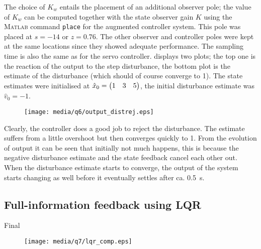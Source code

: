 The choice of $K_w$ entails the placement of an additional observer pole; the value of $K_w$ can be computed together with the state observer gain $K$ using the \textsc{Matlab} command \texttt{place} for the augmented controller system. This pole was placed at $s = -14$ or $z = 0.76$. The other observer and controller poles were kept at the same locations since they showed adequate performance. The sampling time is also the same as for the servo controller.
 displays two plots; the top one is the reaction of the output to the step disturbance, the bottom plot is the estimate of the disturbance (which should of course converge to 1). The state estimates were initialised at $\hat{x}_0 = \mqty(1 & 3 & 5)$, the initial disturbance estimate was $\hat{v}_0 = -1$.
\begin{figure}[ht!]
    \centering
    \texttt{[image: media/q6/output\_distrej.eps]}
    \caption{}
    \label{fig:q6_output_distrej}
\end{figure}
Clearly, the controller does a good job to reject the disturbance. The estimate suffers from a little overshoot but then converges quickly to 1. From the evolution of output it can be seen that initially not much happens, this is because the negative disturbance estimate and the state feedback cancel each other out. When the disturbance estimate starts to converge, the output of the system starts changing as well before it eventually settles after ca. \SI{0.5}{\second}.
\subsection{Full-information feedback using LQR}
\label{sec:ss_lqr}
Final
\begin{figure}
    \centering
    \texttt{[image: media/q7/lqr\_comp.eps]}
    \caption{}
    \label{fig:q7_lqr_comp}
\end{figure}